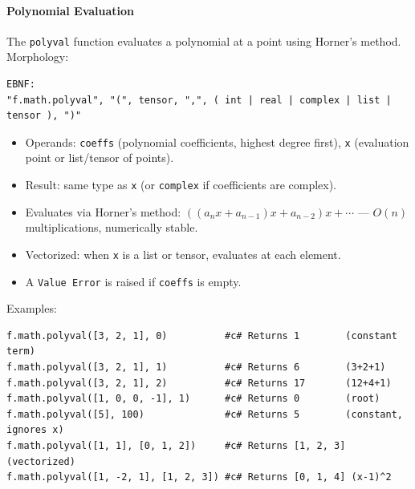 \paragraph{Polynomial Evaluation}
The \texttt{polyval} function evaluates a polynomial at a point using Horner's method. \\ Morphology:
\begin{verbatim}
EBNF:
"f.math.polyval", "(", tensor, ",", ( int | real | complex | list | tensor ), ")"
\end{verbatim}
\begin{itemize}
\item Operands: \texttt{coeffs} (polynomial coefficients, highest degree first), \texttt{x} (evaluation point or list/tensor of points).
\item Result: same type as \texttt{x} (or \texttt{complex} if coefficients are complex).
\item Evaluates via Horner's method: $((a_n x + a_{n-1}) x + a_{n-2}) x + \cdots$ --- $O(n)$ multiplications, numerically stable.
\item Vectorized: when \texttt{x} is a list or tensor, evaluates at each element.
\item A \texttt{Value Error} is raised if \texttt{coeffs} is empty.
\end{itemize}
Examples:
\begin{verbatim}
f.math.polyval([3, 2, 1], 0)          #c# Returns 1        (constant term)
f.math.polyval([3, 2, 1], 1)          #c# Returns 6        (3+2+1)
f.math.polyval([3, 2, 1], 2)          #c# Returns 17       (12+4+1)
f.math.polyval([1, 0, 0, -1], 1)      #c# Returns 0        (root)
f.math.polyval([5], 100)              #c# Returns 5        (constant, ignores x)
f.math.polyval([1, 1], [0, 1, 2])     #c# Returns [1, 2, 3] (vectorized)
f.math.polyval([1, -2, 1], [1, 2, 3]) #c# Returns [0, 1, 4] (x-1)^2
\end{verbatim}

